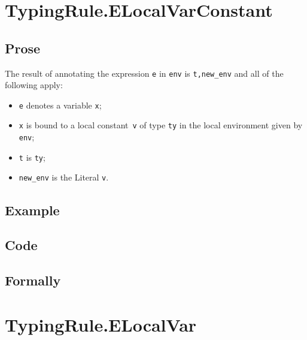 \documentclass{book}
\begin{document}

\section{TypingRule.ELocalVarConstant \label{sec:TypingRule.ELocalVarConstant}}

  \subsection{Prose}
  The result of annotating the expression \texttt{e} in \texttt{env} is
\texttt{t,new\_env} and all of the following apply:  
  \begin{itemize}
  \item \texttt{e} denotes a variable \texttt{x};
  \item \texttt{x} is bound to a local constant~\texttt{v} of type \texttt{ty} in the local environment given by \texttt{env};
  \item \texttt{t} is \texttt{ty};
  \item \texttt{new\_env} is the Literal \texttt{v}.
  \end{itemize}

  \subsection{Example}

  \subsection{Code}

\begin{emptyformal}
  \subsection{Formally}
\end{emptyformal}


\section{TypingRule.ELocalVar \label{sec:TypingRule.ELocalVar}}
\end{document}
